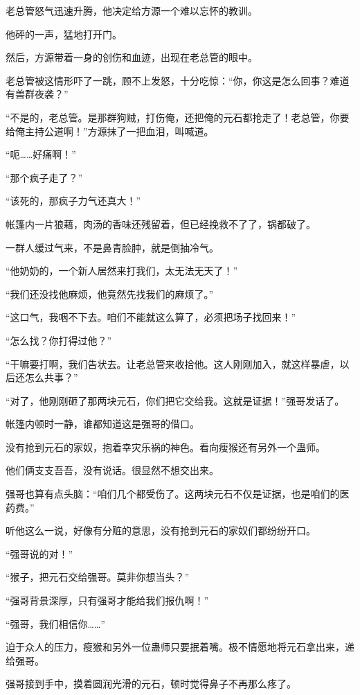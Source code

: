 
\begin{this_body}

老总管怒气迅速升腾，他决定给方源一个难以忘怀的教训。

他砰的一声，猛地打开门。

然后，方源带着一身的创伤和血迹，出现在老总管的眼中。

老总管被这情形吓了一跳，顾不上发怒，十分吃惊：“你，你这是怎么回事？难道有兽群夜袭？”

“不是的，老总管。是那群狗贼，打伤俺，还把俺的元石都抢走了！老总管，你要给俺主持公道啊！”方源抹了一把血泪，叫喊道。

“呃……好痛啊！”

“那个疯子走了？”

“该死的，那疯子力气还真大！”

帐篷内一片狼藉，肉汤的香味还残留着，但已经挽救不了了，锅都破了。

一群人缓过气来，不是鼻青脸肿，就是倒抽冷气。

“他奶奶的，一个新人居然来打我们，太无法无天了！”

“我们还没找他麻烦，他竟然先找我们的麻烦了。”

“这口气，我咽不下去。咱们不能就这么算了，必须把场子找回来！”

“怎么找？你打得过他？”

“干嘛要打啊，我们告状去。让老总管来收拾他。这人刚刚加入，就这样暴虐，以后还怎么共事？”

“对了，他刚刚砸了那两块元石，你们把它交给我。这就是证据！”强哥发话了。

帐篷内顿时一静，谁都知道这是强哥的借口。

没有抢到元石的家奴，抱着幸灾乐祸的神色。看向瘦猴还有另外一个蛊师。

他们俩支支吾吾，没有说话。很显然不想交出来。

强哥也算有点头脑：“咱们几个都受伤了。这两块元石不仅是证据，也是咱们的医药费。”

听他这么一说，好像有分赃的意思，没有抢到元石的家奴们都纷纷开口。

“强哥说的对！”

“猴子，把元石交给强哥。莫非你想当头？”

“强哥背景深厚，只有强哥才能给我们报仇啊！”

“强哥，我们相信你……”

迫于众人的压力，瘦猴和另外一位蛊师只要抿着嘴。极不情愿地将元石拿出来，递给强哥。

强哥接到手中，摸着圆润光滑的元石，顿时觉得鼻子不再那么疼了。


\end{this_body}
